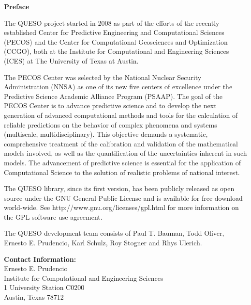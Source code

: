 \clearpage
$~$\\

\clearpage
{\markboth{}{}
}
\tableofcontents


\clearpage
\thispagestyle{empty}
\centerline{\Large\bf Preface}
$~$\\
The QUESO project started in 2008 as part
of the efforts of the recently established Center for Predictive Engineering and Computational Sciences (PECOS)
and the Center for Computational Geosciences and Optimization (CCGO), both at
the Institute for Computational and Engineering Sciences (ICES) at The University of Texas at Austin.

The PECOS Center was selected by the National Nuclear Security Administration (NNSA) as one of its new five centers of excellence
under the Predictive Science Academic Alliance Program (PSAAP).
The goal of the PECOS Center is
to advance predictive science and to develop the next generation of advanced computational methods and tools
for the calculation of reliable predictions on the behavior of complex phenomena and systems (multiscale, multidisciplinary).
This objective demands a systematic, comprehensive treatment of the calibration and validation of the mathematical models involved,
as well as the quantification of the uncertainties inherent in such models.
The advancement of predictive science is essential for the application of Computational Science to the solution of realistic problems of national interest.

The QUESO library, since its first version, has been publicly released as open source
under the GNU General Public License and is available for free download world-wide.
See http://www.gnu.org/licenses/gpl.html for more information on the GPL software use agreement.

The QUESO development team consists of
Paul T. Bauman,
Todd Oliver,
Ernesto E. Prudencio,
Karl Schulz,
Roy Stogner and
Rhys Ulerich.

{\bf Contact Information:}\\
Ernesto E. Prudencio\\
Institute for Computational and Engineering Sciences\\
1 University Station C0200\\
Austin, Texas 78712

